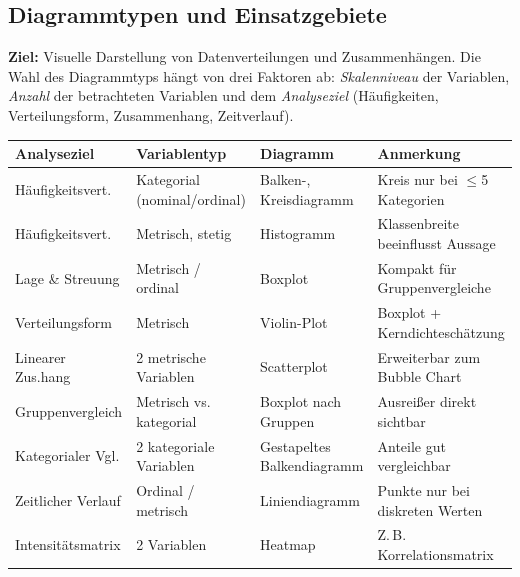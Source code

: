 \newpage

\newpage



\newpage

\subsection{Diagrammtypen und Einsatzgebiete}

\textbf{Ziel:} Visuelle Darstellung von Datenverteilungen und Zusammenhängen.
Die Wahl des Diagrammtyps hängt von drei Faktoren ab: \emph{Skalenniveau} der Variablen,
\emph{Anzahl} der betrachteten Variablen und dem \emph{Analyseziel}
(Häufigkeiten, Verteilungsform, Zusammenhang, Zeitverlauf).

\medskip

\begin{table}[H]
\centering\small
\begin{tabular}{p{2.6cm} p{3.8cm} p{4.0cm} p{3.2cm}}
\toprule
\textbf{Analyseziel} & \textbf{Variablentyp} & \textbf{Diagramm} & \textbf{Anmerkung} \\
\midrule
Häufigkeitsvert. & Kategorial (nominal/ordinal) & Balken-, Kreisdiagramm & Kreis nur bei $\leq$5 Kategorien \\[4pt]
Häufigkeitsvert. & Metrisch, stetig & Histogramm & Klassenbreite beeinflusst Aussage \\[4pt]
Lage \& Streuung & Metrisch / ordinal & Boxplot & Kompakt für Gruppenvergleiche \\[4pt]
Verteilungsform & Metrisch & Violin-Plot & Boxplot + Kerndichteschätzung \\[4pt]
Linearer Zus.hang & 2 metrische Variablen & Scatterplot & Erweiterbar zum Bubble Chart \\[4pt]
Gruppenvergleich & Metrisch vs. kategorial & Boxplot nach Gruppen & Ausreißer direkt sichtbar \\[4pt]
Kategorialer Vgl. & 2 kategoriale Variablen & Gestapeltes Balkendiagramm & Anteile gut vergleichbar \\[4pt]
Zeitlicher Verlauf & Ordinal / metrisch & Liniendiagramm & Punkte nur bei diskreten Werten \\[4pt]
Intensitätsmatrix & 2 Variablen & Heatmap & Z.\,B. Korrelationsmatrix \\
\bottomrule
\end{tabular}
\end{table}

